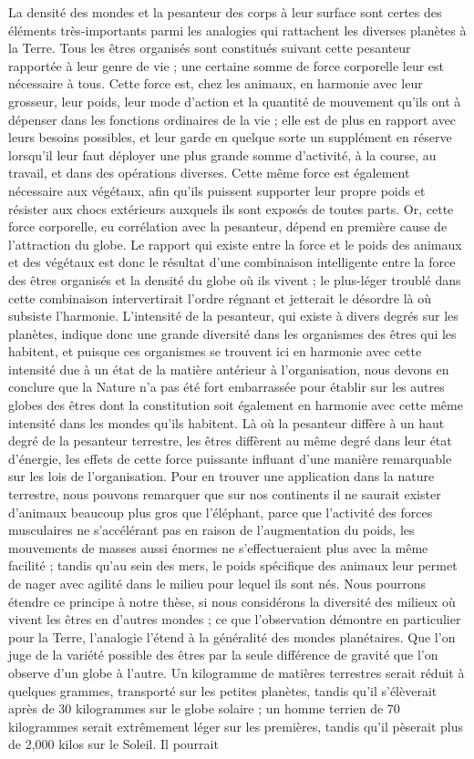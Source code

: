 \documentclass[a4paper, 11pt, oneside]{article}
\begin{document}
La densité des mondes et la pesanteur des corps à leur surface sont certes des éléments très-importants parmi les analogies qui rattachent les diverses planètes à la Terre. Tous les êtres organisés sont constitués suivant cette pesanteur rapportée à leur genre de vie ; une certaine somme de force corporelle leur est nécessaire à tous. Cette force est, chez les animaux, en harmonie avec leur grosseur, leur poids, leur mode d'action et la quantité de mouvement qu'ils ont à dépenser dans les fonctions ordinaires de la vie ; elle est de plus en rapport avec leurs besoins possibles, et leur garde en quelque sorte un supplément en réserve lorsqu'il leur faut déployer une plus grande somme d'activité, à la course, au travail, et dans des opérations diverses. Cette même force est également nécessaire aux végétaux, afin qu'ils puissent supporter leur propre poids et résister aux chocs extérieurs auxquels ils sont exposés de toutes parts. Or, cette force corporelle, eu corrélation avec la pesanteur, dépend en première cause de l'attraction du globe. Le rapport qui existe entre la force et le poids des animaux et des végétaux est donc le résultat d'une combinaison intelligente entre la force des êtres organisés et la densité du globe où ils vivent ; le plus-léger troublé dans cette combinaison intervertirait l'ordre régnant et jetterait le désordre là où subsiste l'harmonie. L'intensité de la pesanteur, qui existe à divers degrés sur les planètes, indique donc une grande diversité dans les organismes des êtres qui les habitent, et puisque ces organismes se trouvent ici en harmonie avec cette intensité due à un état de la matière antérieur à l'organisation, nous devons en conclure que la Nature n'a pas été fort embarrassée pour établir sur les autres globes des êtres dont la constitution soit également en harmonie avec cette même intensité dans les mondes qu'ils habitent. Là où la pesanteur diffère à un haut degré de la pesanteur terrestre, les êtres diffèrent au même degré dans leur état d'énergie, les effets de cette force puissante influant d'une manière remarquable sur les lois de l'organisation. Pour en trouver une application dans la nature terrestre, nous pouvons remarquer que sur nos continents il ne saurait exister d'animaux beaucoup plus gros que l'éléphant, parce que l'activité des forces musculaires ne s'accélérant pas en raison de l'augmentation du poids, les mouvements de masses aussi énormes ne s'effectueraient plus avec la même facilité ; tandis qu'au sein des mers, le poids spécifique des animaux leur permet de nager avec agilité dans le milieu pour lequel ils sont nés. Nous pourrons étendre ce principe à notre thèse, si nous considérons la diversité des milieux où vivent les êtres en d'autres mondes ; ce que l'observation démontre en particulier pour la Terre, l'analogie l'étend à la généralité des mondes planétaires. Que l'on juge de la variété possible des êtres par la seule différence de gravité que l'on observe d'un globe à l'autre. Un kilogramme de matières terrestres serait réduit à quelques grammes, transporté sur les petites planètes, tandis qu'il s'élèverait après de 30 kilogrammes sur le globe solaire ; un homme terrien de 70 kilogrammes serait extrêmement léger sur les premières, tandis qu'il pèserait plus de 2,000 kilos sur le Soleil. Il pourrait 
\end{document}
